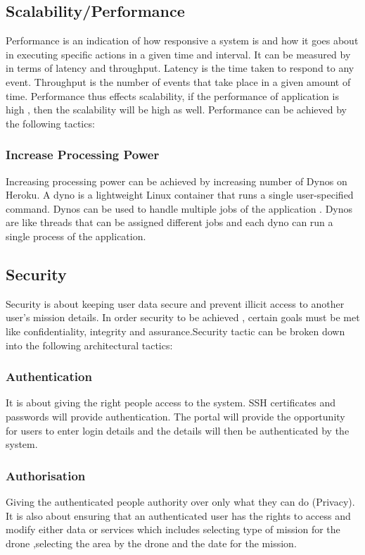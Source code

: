 \documentclass{article}
\begin{document}
	\subsection{Scalability/Performance }
	Performance is an indication of how responsive a system is and how it goes about in executing specific actions in a given time and interval. It can be measured by in terms of latency and throughput.
	Latency is the time taken to respond to any event. Throughput is the number of events that take place in a given amount of time. Performance thus effects scalability, if the performance of application is high , then the scalability will be high as well. Performance can be achieved by the following tactics:
	\subsubsection{Increase Processing Power}
	Increasing processing power can be achieved by increasing number of Dynos on Heroku. A dyno is a lightweight Linux container that runs a single user-specified command. Dynos can be used to handle multiple jobs of the application . Dynos are like threads that can be assigned different jobs and each dyno can run a single process of the application.
	\subsection{Security}
	Security is about keeping user data secure and prevent illicit access to another user's mission details. In order security to be achieved , certain goals must be met like confidentiality, integrity and assurance.Security tactic can be broken down into the following architectural tactics: 
	\subsubsection{Authentication}
	It is about giving the right people access to the system. SSH certificates and passwords will provide authentication. The portal will provide the opportunity for users to enter login details and the details will then be authenticated by the system. 
	\subsubsection{Authorisation}
	Giving the authenticated people authority over only what they can do (Privacy). It is also about ensuring that an authenticated user has the rights to access and modify either data or services which includes selecting type of mission for the drone ,selecting the area by the drone and the date for the mission.
	
\end{document}
